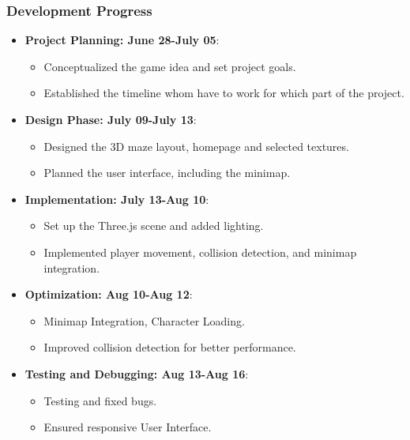 \documentclass[9pt]{beamer}
\begin{document}
\begin{frame}
    \frametitle{Development Progress}
    \begin{itemize}
        \item \textbf{Project Planning: June 28-July 05}: 
        \begin{itemize}
            \item Conceptualized the game idea and set project goals.
            \item Established the timeline whom have to work for which part of the project.
        \end{itemize}
        \vspace{0.5em}
        
        \item \textbf{Design Phase: July 09-July 13}: 
        \begin{itemize}
            \item Designed the 3D maze layout, homepage and selected textures.
            \item Planned the user interface, including the minimap.
        \end{itemize}
        \vspace{0.5em}
        
        \item \textbf{Implementation: July 13-Aug 10}: 
        \begin{itemize}
            \item Set up the Three.js scene and added lighting.
            \item Implemented player movement, collision detection, and minimap integration.
        \end{itemize}
        \vspace{0.5em}
        
        \item \textbf{Optimization: Aug 10-Aug 12}: 
        \begin{itemize}
            \item Minimap Integration, Character Loading.
            \item Improved collision detection for better performance.
        \end{itemize}
        
        \vspace{0.5em}
        \item \textbf{Testing and Debugging: Aug 13-Aug 16}: 
        \begin{itemize}
            \item Testing and fixed bugs.
            \item Ensured responsive User Interface.
        \end{itemize}
    \end{itemize}
\end{frame}
        
\end{document}
